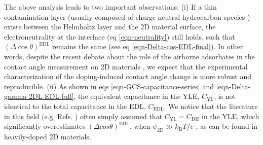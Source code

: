 \documentclass[journal=jacsat,manuscript=article,email=true]{achemso}
\begin{document}
The above analysis leads to two important observations: (i) If a thin
contamination layer (usually composed of charge-neutral hydrocarbon
species \cite{li_effect_2013}) exists between the Helmholtz layer and
the 2D material surface, the electroneutrality at the interface (eq
\ref{eqn-neutrality}) still holds, such that \((\Delta \cos
\theta)^{\mathrm{EDL}}\) remains the same (see eq
\ref{eqn-Delta-cos-EDL-final}). In other words, despite the recent
debate about the role of the airborne adsorbates in the contact angle
measurement on 2D materials
\cite{li_effect_2013,Kozbial_2015,Xu_2013_withwhat,Chow_2015}, we expect
that the experimental characterization of the doping-induced contact
angle change is more robust and reproducible. (ii) As shown in eqs
\ref{eqn-GCS-capacitance-series} and \ref{eqn-Delta-gamma-2DL-EDL-full},
the equivalent capacitance in the YLE, \(C_{\mathrm{YL}}\), is not
identical to the total capacitance in the EDL, \(C_{\mathrm{EDL}}\). We
notice that the literature in this field (e.g. Refs.
)
often simply assumed that \(C_{\mathrm{YL}}=C_{\mathrm{DH}}\) in the
YLE, which significantly overestimates \((\Delta cos
\theta)^{\mathrm{EDL}}\), when \(\psi_{\mathrm{2D}} \gg
k_{\mathrm{B}}T/e\) \cite{israelachvili03_inter}, as can be found in heavily-doped 2D materials. 
\end{document}
